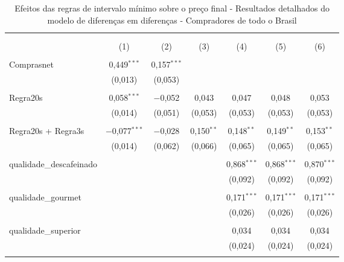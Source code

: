 \setlength{\tabcolsep}{2pt}
\small
\begin{table}[!htbp]
\centering
\begin{threeparttable}
  \centering
  \caption{Efeitos das regras de intervalo mínimo sobre o preço final - Resultados detalhados do modelo de diferenças em diferenças - Compradores de todo o Brasil}
  \label{dd_results_win_bid_br_complete} 
\begin{tabular}{lcccccc} 
\\[-1.8ex]\hline 
\hline \\[-1.8ex] 
\\[-1.8ex] & (1) & (2) & (3) & (4) & (5) & (6)\\ 
\hline \\[-1.8ex]

Comprasnet & 0,449$^{***}$ & 0,157$^{***}$ &  &  &  & \\ 
  & (0,013) & (0,053) &  &  &  &  \\ 
  & & & & & & \\ 

 Regra20s & 0,058$^{***}$ & $-$0,052 & 0,043 & 0,047 & 0,048 & 0,053 \\ 
  & (0,014) & (0,051) & (0,053) & (0,053) & (0,053) & (0,053) \\ 
  & & & & & &  \\ 
 Regra20s + Regra3s & $-$0,077$^{***}$ & $-$0,028 & 0,150$^{**}$ & 0,148$^{**}$ & 0,149$^{**}$ & 0,153$^{**}$ \\ 
  & (0,014) & (0,062) & (0,066) & (0,065) & (0,065) & (0,065) \\ 
  & & & & & & \\ 

qualidade\_descafeinado &  &  &  & 0,868$^{***}$ & 0,868$^{***}$ & 0,870$^{***}$ \\ 
  &  &  &  & (0,092) & (0,092) & (0,092) \\ 
  & & & & & & \\ 

qualidade\_gourmet &  &  &  & 0,171$^{***}$ & 0,171$^{***}$ & 0,171$^{***}$ \\ 
  &  &  &  & (0,026) & (0,026) & (0,026) \\ 
  & & & & & & \\ 

qualidade\_superior  &  &  &  & 0,034 & 0,034& 0,034 \\ 
  &  &  &  & (0,024) & (0,024) &(0,024) \\ 
  & & & & & & \\ 


\end{tabular}
\end{threeparttable}
\end{table}
